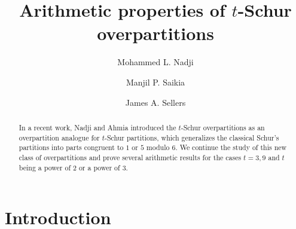 \documentclass[12pt]{amsart}
\title{Arithmetic properties of $t$-Schur overpartitions}
\theoremstyle{plain}
\theoremstyle{definition}
\begin{document}
\author[Mohammed L. Nadji]{Mohammed L. Nadji}
\address{Faculty of Mathematics, University of Science and Technology Houari Boumediene, Algiers,
Algeria}
\address{RECITS laboratory, BP 32, El Alia, Bab Ezzouar, Algiers 16111, Algeria}

\author[Manjil P. Saikia]{Manjil P. Saikia}
\address{Mathematical and Physical Sciences division, School of Arts \& Sciences, Ahmedabad University, Navrangpura, Ahmedabad 380009, Gujarat, India}


\author[James A. Sellers]{James A. Sellers}
\address{Department of Mathematics and Statistics, University of Minnesota Duluth, Duluth, MN, USA}



\newcommand{\nadji}[1]{\mbox{}{\sf\color{green}[Nadji: #1]}\marginpar{\color{green}\Large$*$}} 

\newcommand{\manjil}[1]{\mbox{}{\sf\color{magenta}[Saikia: #1]}\marginpar{\color{magenta}\Large$*$}} 


\newcommand{\sellers}[1]{\mbox{}{\sf\color{blue}[Sellers: #1]}\marginpar{\color{blue}\Large$*$}} 



\begin{abstract} In a recent work, Nadji and Ahmia introduced the $t$-Schur overpartitions as an overpartition analogue for $t$-Schur partitions, which generalizes the classical Schur's partitions into parts congruent to $1$ or $5$ modulo $6$. We continue the study of this new class of overpartitions and prove several arithmetic results for the cases $t=3,9$ and $t$ being a power of $2$ or a power of $3$. 


\end{abstract}

\maketitle

\section{Introduction}
\label{intro}
\end{document}
